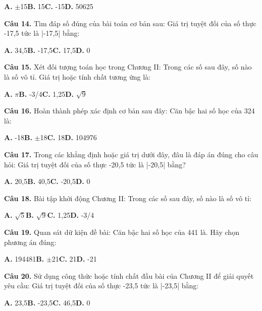 \documentclass[11pt,a4paper]{article}
\begin{document}
\hspace*{1.5em}\textbf{A.} $\pm$15\quad\quad \textbf{B.} 15\quad\quad \textbf{C.} -15\quad\quad \textbf{D.} 50625\par\vspace{2pt}
\textbf{\color{primary} Câu 14.} Tìm đáp số đúng của bài toán cơ bản sau: Giá trị tuyệt đối của số thực -17,5 tức là |-17,5| bằng:\par
\hspace*{1.5em}\textbf{A.} 34,5\quad\quad \textbf{B.} -17,5\quad\quad \textbf{C.} 17,5\quad\quad \textbf{D.} 0\par\vspace{2pt}
\textbf{\color{primary} Câu 15.} Xét đối tượng toán học trong Chương II: Trong các số sau đây, số nào là số vô tỉ. Giá trị hoặc tính chất tương ứng là:\par
\hspace*{1.5em}\textbf{A.} $\pi$\quad\quad \textbf{B.} -3/4\quad\quad \textbf{C.} 1,25\quad\quad \textbf{D.} $\sqrt{9}$\par\vspace{2pt}
\textbf{\color{primary} Câu 16.} Hoàn thành phép xác định cơ bản sau đây: Căn bậc hai số học của 324 là:\par
\hspace*{1.5em}\textbf{A.} -18\quad\quad \textbf{B.} $\pm$18\quad\quad \textbf{C.} 18\quad\quad \textbf{D.} 104976\par\vspace{2pt}
\textbf{\color{primary} Câu 17.} Trong các khẳng định hoặc giá trị dưới đây, đâu là đáp án đúng cho câu hỏi: Giá trị tuyệt đối của số thực -20,5 tức là |-20,5| bằng?\par
\hspace*{1.5em}\textbf{A.} 20,5\quad\quad \textbf{B.} 40,5\quad\quad \textbf{C.} -20,5\quad\quad \textbf{D.} 0\par\vspace{2pt}
\textbf{\color{primary} Câu 18.} Bài tập khởi động Chương II: Trong các số sau đây, số nào là số vô tỉ:\par
\hspace*{1.5em}\textbf{A.} $\sqrt{5}$\quad\quad \textbf{B.} $\sqrt{9}$\quad\quad \textbf{C.} 1,25\quad\quad \textbf{D.} -3/4\par\vspace{2pt}
\textbf{\color{primary} Câu 19.} Quan sát dữ kiện đề bài: Căn bậc hai số học của 441 là. Hãy chọn phương án đúng:\par
\hspace*{1.5em}\textbf{A.} 194481\quad\quad \textbf{B.} $\pm$21\quad\quad \textbf{C.} 21\quad\quad \textbf{D.} -21\par\vspace{2pt}
\textbf{\color{primary} Câu 20.} Sử dụng công thức hoặc tính chất đầu bài của Chương II để giải quyết yêu cầu: Giá trị tuyệt đối của số thực -23,5 tức là |-23,5| bằng:\par
\hspace*{1.5em}\textbf{A.} 23,5\quad\quad \textbf{B.} -23,5\quad\quad \textbf{C.} 46,5\quad\quad \textbf{D.} 0\par\vspace{2pt}
\end{document}
